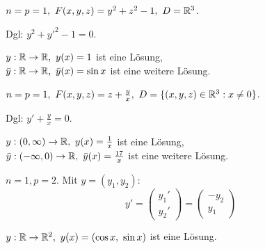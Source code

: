 \documentclass{article}
\begin{document}
\begin{beispiele}
\item $n=p=1,\ F(x,y,z) = y^2+z^2-1,\ D=\MdR^3$.

Dgl: $y^2+y'^2-1=0.$

$y:\mathbb{R}\to\mathbb{R},\ y(x)=1$ ist eine Lösung,\\
$\bar{y}:\mathbb{R}\to\mathbb{R},\ \bar{y}(x)=\sin x$ ist eine weitere Lösung.

\item $n=p=1,\ F(x,y,z)=z+\frac{y}{x},\ D=\{(x,y,z)\in\MdR^3:x\ne0\}$.

Dgl: $y'+\frac{y}{x}=0.$

$y:(0,\infty)\to\MdR,\ y(x)=\frac{1}{x}$ ist eine Lösung,\\
$\bar{y}:(-\infty,0)\to\MdR,\ \bar{y}(x)=\frac{17}{x}$ ist eine weitere Lösung.

\item $n=1,p=2.$ Mit $y=(y_1,y_2):$
$$y'=\begin{pmatrix}y_1'\\ y_2'\end{pmatrix} = \begin{pmatrix}-y_2\\ y_1\end{pmatrix}$$

$y:\mathbb{R}\to\mathbb{R}^2,\ y(x)=(\cos x,\ \sin x)$ ist eine Lösung.
\end{beispiele}
\end{document}
